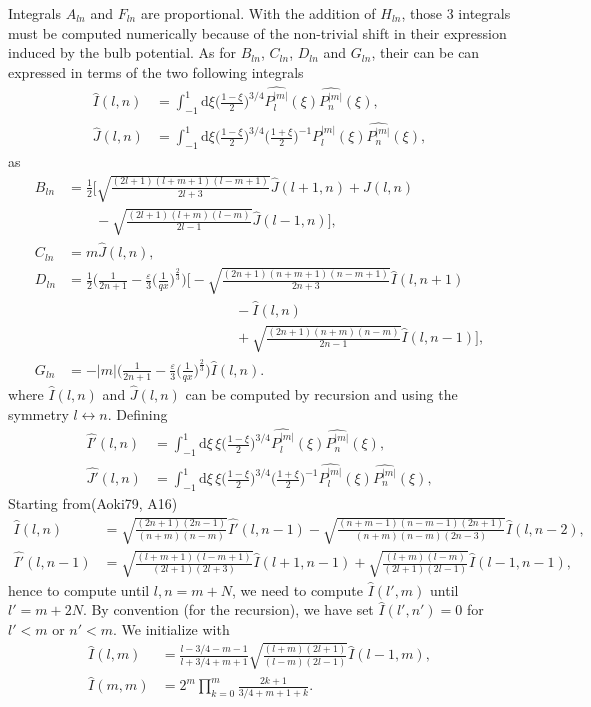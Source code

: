 \documentclass[11pt]{article}
\newcommand{\rd}{\mathrm{d}}
\newcommand{\Pnm}{P_n^{|m|}}
\newcommand{\Plm}{P_l^{|m|}}
\newcommand{\hPnm}{\widehat{\Pnm}}
\newcommand{\hPlm}{\widehat{\Plm}}
\newcommand{\hI}{\widehat{I}}
\newcommand{\hJ}{\widehat{J}}
\newcommand{\hIp}{\widehat{I'}}
\newcommand{\hJp}{\widehat{J'}}
\begin{document}
Integrals $A_{ln}$ and  $F_{ln}$ are proportional. With the addition of $H_{ln}$, those 3 integrals must be computed numerically because of the non-trivial shift in their expression induced by the bulb potential. As for $B_{ln}$, $C_{ln}$, $D_{ln}$ and $G_{ln}$, their can be can expressed in terms of the two following integrals 
\begin{align}
\hI(l,n) &= \int_{-1}^{1} \rd \xi  \bigg(\frac{1-\xi}{2}\bigg)^{3/4} \hPlm(\xi)  \hPnm(\xi), \\
\hJ(l,n) &= \int_{-1}^{1} \rd \xi  \bigg(\frac{1-\xi}{2}\bigg)^{3/4}  \bigg(\frac{1+\xi}{2}\bigg)^{-1}\hPlm(\xi)  \hPnm(\xi) ,
\end{align}
as
\begin{align*}
B_{ln} &= \frac{1}{2} \bigg[ \sqrt{\frac{(2l+1)(l+m+1)(l-m+1)}{2l+3}} \hJ(l+1,n)+ \hJ(l,n)\\
&\quad \quad  -\sqrt{\frac{(2l+1)(l+m)(l-m)}{2l-1}} \hJ(l-1,n)\bigg] ,\\
C_{ln} &= m \hJ(l,n) ,\\
D_{ln} &= \frac{1}{2}  \bigg(\frac{1}{2n+1}-\frac{\varepsilon}{3}  \bigg(\frac{1}{qx}\bigg)^{\frac{2}{3}} \bigg)
\bigg[ -\sqrt{\frac{(2n+1)(n+m+1)(n-m+1)}{2n+3}} \hI(l,n+1) \\
&\quad \quad \quad \quad \quad \quad\quad \quad\quad \quad \quad \quad- \hI(l,n) \\
&\quad \quad \quad \quad \quad \quad\quad \quad\quad \quad \quad \quad  +\sqrt{\frac{(2n+1)(n+m)(n-m)}{2n-1}} \hI(l,n-1)\bigg] ,\\
G_{ln} &= -|m| \bigg(\frac{1}{2n+1}-\frac{\varepsilon}{3}  \bigg(\frac{1}{qx}\bigg)^{\frac{2}{3}} \bigg)  \hI(l,n) .
\end{align*}
where $\hI(l,n)$ and $\hJ(l,n)$ can be computed by recursion and using the symmetry $l\leftrightarrow n$. Defining
\begin{align}
\hIp(l,n) &= \int_{-1}^{1} \rd \xi \, \xi \bigg(\frac{1-\xi}{2}\bigg)^{3/4} \hPlm(\xi)  \hPnm(\xi), \\
\hJp(l,n) &= \int_{-1}^{1} \rd \xi \, \xi \bigg(\frac{1-\xi}{2}\bigg)^{3/4}  \bigg(\frac{1+\xi}{2}\bigg)^{-1}\hPlm(\xi)  \hPnm(\xi) ,
\end{align}
Starting from(Aoki79, A16)
\begin{align*}
\hI(l,n) &= \sqrt{\frac{(2n+1)(2n-1)}{(n+m)(n-m)}} \hIp(l,n-1)-\sqrt{\frac{(n+m-1)(n-m-1)(2n+1)}{(n+m)(n-m)(2n-3)}} \hI(l,n-2) ,\\
\hIp(l,n-1) &= \sqrt{\frac{(l+m+1)(l-m+1)}{(2l+1)(2l+3)}} \hI(l+1,n-1)+\sqrt{\frac{(l+m)(l-m)}{(2l+1)(2l-1)}} \hI(l-1,n-1) ,
\end{align*}
hence to compute until $l,n=m+N$, we need to compute $\hI(l',m)$ until $l'=m+2N$. By convention (for the recursion), we have set $\hI(l',n')=0$ for $l'<m$ or  $n'<m$.
We initialize with
\begin{align*}
\hI(l,m) &= \frac{l-3/4-m-1}{l+3/4+m+1} \sqrt{\frac{(l+m)(2l+1)}{(l-m)(2l-1)}} \hI(l-1,m) ,\\
\hI(m,m) &= 2^m \prod_{k=0}^{m} \frac{2k+1}{3/4 + m + 1 + k} .
\end{align*}
\end{document}
